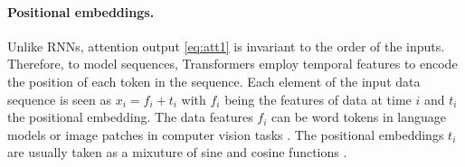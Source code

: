 \paragraph{Positional embeddings.} Unlike RNNs, attention output \eqref{eq:att1} is invariant to the order of the inputs. 
Therefore, to model sequences, Transformers employ temporal features to encode the position of each token in the sequence.
Each element of the input data sequence is seen as $x_i= f_i + t_i$ with $f_i$ being the features of data at time $i$ and $t_i$ the positional embedding.
The data features $f_i$ can be word tokens in language models or image patches in computer vision tasks \citep{dosovitskiy2021imageworth16x16words}.
The positional embeddings $t_i$ are usually taken as a mixuture of sine and cosine functions \citep{vaswani_attention_2017}.


